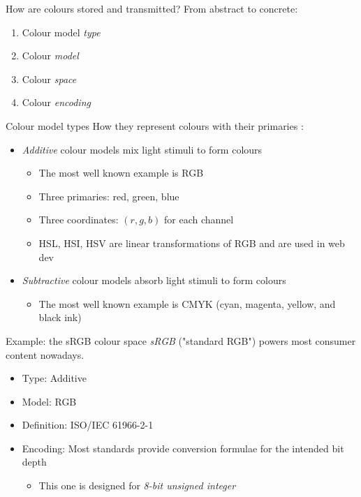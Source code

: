 \documentclass[aspectratio=169,handout,usepdftitle=false]{fireshonks}
\begin{document}
\begin{frame}{How are colours stored and transmitted?}
    From abstract to concrete:
    \begin{enumerate}
        \item Colour model \emph{type}
        \item Colour \emph{model}
        \item Colour \emph{space}
        \item Colour \emph{encoding}
    \end{enumerate}
\end{frame}
\begin{frame}{Colour model types}
    How they represent colours with their primaries \autocite{allen23}:
    \begin{itemize}
        \item \emph{Additive} colour models mix light stimuli to form colours
              \begin{itemize}
                  \item The most well known example is RGB
                  \item Three primaries: red, green, blue
                  \item Three coordinates: $(r, g, b)$ for each channel
                  \item HSL, HSI, HSV are linear transformations of RGB and are used in web dev
              \end{itemize}
        \item \emph{Subtractive} colour models absorb light stimuli to form colours
              \begin{itemize}
                  \item The most well known example is CMYK (cyan, magenta, yellow, and black ink)
              \end{itemize}
    \end{itemize}
\end{frame}
\begin{frame}{Example: the sRGB colour space}
    \emph{sRGB} ("standard RGB") powers most consumer content nowadays.
    \begin{itemize}
        \item Type: Additive
        \item Model: RGB
        \item Definition: ISO/IEC 61966-2-1 \parencite*{srgb2002}
        \item Encoding: Most standards provide conversion formulae for the intended bit depth
              \begin{itemize}
                  \item This one is designed for \emph{8-bit unsigned integer}
              \end{itemize}
    \end{itemize}
\end{frame}
\end{document}

